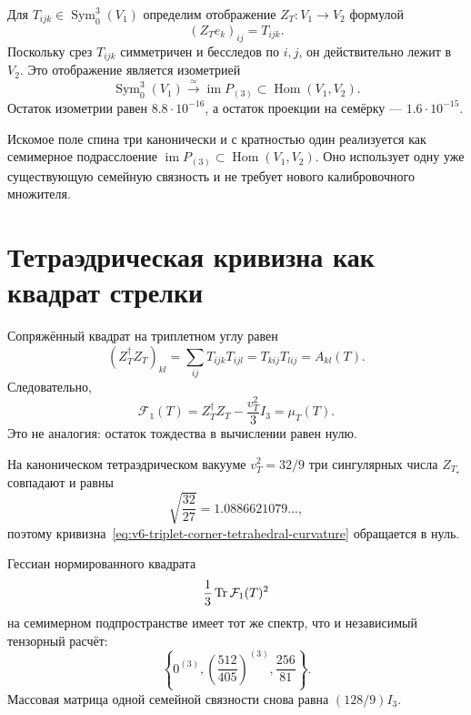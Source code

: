 Для $T_{ijk}\in\operatorname{Sym}^3_0(V_1)$ определим отображение
$Z_T:V_1\to V_2$ формулой
\begin{equation}
 (Z_T e_k)_{ij}=T_{ijk}.
 \label{eq:v6-tensor-to-triplet-quintet-arrow}
\end{equation}
Поскольку срез $T_{ij k}$ симметричен и бесследов по $i,j$, он
действительно лежит в $V_2$. Это отображение является изометрией
\begin{equation}
 \operatorname{Sym}^3_0(V_1)
 \xrightarrow{\ \simeq\ }
 \operatorname{im}P_{(3)}
 \subset\operatorname{Hom}(V_1,V_2).
 \label{eq:v6-spin-three-arrow-isometry}
\end{equation}
Остаток изометрии равен $8.8\cdot10^{-16}$, а остаток проекции на
семёрку --- $1.6\cdot10^{-15}$.

\begin{theorem}
Искомое поле спина три канонически и с кратностью один реализуется как
семимерное подрасслоение
$\operatorname{im}P_{(3)}\subset\operatorname{Hom}(V_1,V_2)$. Оно
использует одну уже существующую семейную связность и не требует нового
калибровочного множителя.
\end{theorem}

\section{Тетраэдрическая кривизна как квадрат стрелки}

Сопряжённый квадрат на триплетном углу равен
\begin{equation}
 (Z_T^\dagger Z_T)_{kl}
 =\sum_{ij}T_{ijk}T_{ijl}
 =T_{kij}T_{lij}=A_{kl}(T).
 \label{eq:v6-arrow-square-tensor-contraction}
\end{equation}
Следовательно,
\begin{equation}
 \mathcal F_{1}(T)
 =Z_T^\dagger Z_T-\frac{v_T^2}{3}I_3
 =\mu_T(T).
 \label{eq:v6-triplet-corner-tetrahedral-curvature}
\end{equation}
Это не аналогия: остаток тождества в вычислении равен нулю.

На каноническом тетраэдрическом вакууме
$v_T^2=32/9$ три сингулярных числа $Z_{T_\star}$ совпадают и равны
\begin{equation}
 \sqrt{\frac{32}{27}}=1.0886621079\ldots,
\end{equation}
поэтому кривизна~\eqref{eq:v6-triplet-corner-tetrahedral-curvature}
обращается в нуль.

Гессиан нормированного квадрата
\begin{equation}
 \frac13\operatorname{Tr}\mathcal F_1(T)^2
\end{equation}
на семимерном подпространстве имеет тот же спектр, что и независимый
тензорный расчёт:
\begin{equation}
 \left\{0^{(3)},
 \left(\frac{512}{405}\right)^{(3)},
 \frac{256}{81}\right\}.
 \label{eq:v6-embedded-spin-three-hessian}
\end{equation}
Массовая матрица одной семейной связности снова равна
$(128/9)I_3$.

